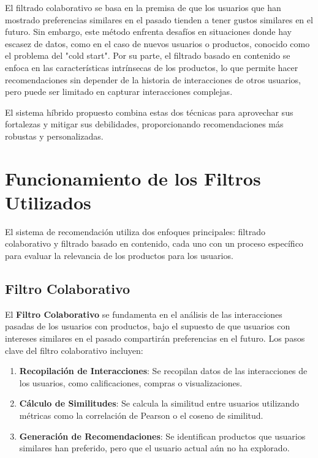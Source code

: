 \documentclass{llncs}
\begin{document}
El filtrado colaborativo se basa en la premisa de que los usuarios que han mostrado preferencias similares en el pasado tienden a tener gustos similares en el futuro. Sin embargo, este método enfrenta desafíos en situaciones donde hay escasez de datos, como en el caso de nuevos usuarios o productos, conocido como el problema del "cold start". Por su parte, el filtrado basado en contenido se enfoca en las características intrínsecas de los productos, lo que permite hacer recomendaciones sin depender de la historia de interacciones de otros usuarios, pero puede ser limitado en capturar interacciones complejas.

El sistema híbrido propuesto combina estas dos técnicas para aprovechar sus fortalezas y mitigar sus debilidades, proporcionando recomendaciones más robustas y personalizadas.

\section{Funcionamiento de los Filtros Utilizados}
El sistema de recomendación utiliza dos enfoques principales: filtrado colaborativo y filtrado basado en contenido, cada uno con un proceso específico para evaluar la relevancia de los productos para los usuarios.

\subsection{Filtro Colaborativo}
El \textbf{Filtro Colaborativo} se fundamenta en el análisis de las interacciones pasadas de los usuarios con productos, bajo el supuesto de que usuarios con intereses similares en el pasado compartirán preferencias en el futuro. Los pasos clave del filtro colaborativo incluyen:

\begin{enumerate}
    \item \textbf{Recopilación de Interacciones}: Se recopilan datos de las interacciones de los usuarios, como calificaciones, compras o visualizaciones.
    \item \textbf{Cálculo de Similitudes}: Se calcula la similitud entre usuarios utilizando métricas como la correlación de Pearson o el coseno de similitud.
    \item \textbf{Generación de Recomendaciones}: Se identifican productos que usuarios similares han preferido, pero que el usuario actual aún no ha explorado.
\end{enumerate}
\end{document}
